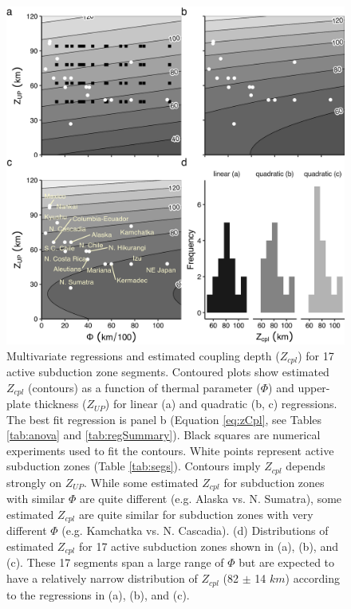 \begin{figure}[htbp]

{\centering \includegraphics[width=1\linewidth,]{assets/figs/chpt2/fig4} 

}

\caption[Estimated coupling depths for 17 active subduction zone segments]{Multivariate regressions and estimated coupling depth ($Z_{cpl}$) for 17 active subduction zone segments. Contoured plots show estimated $Z_{cpl}$ (contours) as a function of thermal parameter ($\Phi$) and upper-plate thickness ($Z_{UP}$) for linear (a) and quadratic (b, c) regressions. The best fit regression is panel b (Equation \ref{eq:zCpl}, see Tables \ref{tab:anova} and \ref{tab:regSummary}). Black squares are numerical experiments used to fit the contours. White points represent active subduction zones (Table \ref{tab:segs}). Contours imply $Z_{cpl}$ depends strongly on $Z_{UP}$. While some estimated $Z_{cpl}$ for subduction zones with similar $\Phi$ are quite different (e.g. Alaska vs. N. Sumatra), some estimated $Z_{cpl}$ are quite similar for subduction zones with very different $\Phi$ (e.g. Kamchatka vs. N. Cascadia). (d) Distributions of estimated $Z_{cpl}$ for 17 active subduction zones shown in (a), (b), and (c). These 17 segments span a large range of $\Phi$ but are expected to have a relatively narrow distribution of $Z_{cpl}$ (82 $\pm$ 14 $km$) according to the regressions in (a), (b), and (c).}\label{fig:multiv}
\end{figure}

